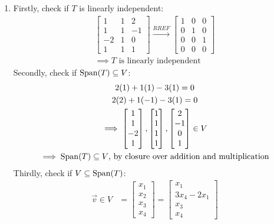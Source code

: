 \documentclass[12pt, a4paper]{article}
\begin{document}
\begin{enumerate}[Q\arabic*.]
\begin{enumerate}[(\alph*)]
      \item Firstly, check if $T$ is linearly independent:
        \begin{gather*}
          \begin{bmatrix}
            1 & 1 & 2\\
            1 & 1 & -1\\
            -2 & 1 & 0\\
            1 & 1 & 1
          \end{bmatrix}\xrightarrow{RREF}
          \begin{bmatrix}
            1 & 0 & 0\\
            0 & 1 & 0\\
            0 & 0 & 1\\
            0 & 0 & 0
          \end{bmatrix}\\
          \implies T\text{ is linearly independent}
        \end{gather*}
        Secondly, check if $\operatorname{Span}(T) \subseteq V$:
        \begin{gather*}
          2(1) + 1(1) - 3(1) = 0\\
          2(2) + 1(-1) - 3(1) = 0\\
          \implies \begin{bmatrix}1\\1\\-2\\1\end{bmatrix}, \begin{bmatrix}1\\1\\1\\1\end{bmatrix}, \begin{bmatrix}2\\-1\\0\\1\end{bmatrix} \in V\\
          \implies \operatorname{Span}(T) \subseteq V\text{, by closure over addition and multiplication}
        \end{gather*}
        Thirdly, check if $V \subseteq \operatorname{Span}(T)$:
        \begin{align*}
          \vec{v} \in V &= \begin{bmatrix}x_1\\x_2\\x_3\\x_4\end{bmatrix} = \begin{bmatrix}x_1\\3x_4-2x_1\\x_3\\x_4\end{bmatrix}\\

\end{align*}
\end{enumerate}
\end{enumerate}
\end{document}
